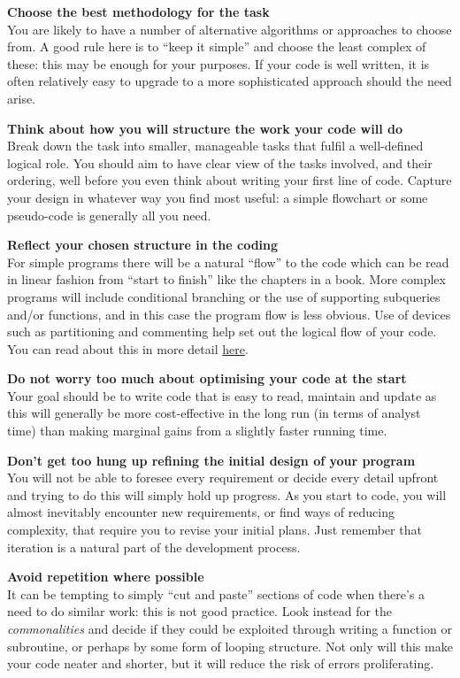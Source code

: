 \documentclass[
]{book}
\begin{document}
\textbf{Choose the best methodology for the task}\\
You are likely to have a number of alternative algorithms or approaches to choose from. A good rule here is to ``keep it simple'' and choose the least complex of these: this may be enough for your purposes. If your code is well written, it is often relatively easy to upgrade to a more sophisticated approach should the need arise.

\textbf{Think about how you will structure the work your code will do}\\
Break down the task into smaller, manageable tasks that fulfil a well-defined logical role. You should aim to have clear view of the tasks involved, and their ordering, well before you even think about writing your first line of code. Capture your design in whatever way you find most useful: a simple flowchart or some pseudo-code is generally all you need.

\textbf{Reflect your chosen structure in the coding}\\
For simple programs there will be a natural ``flow'' to the code which can be read in linear fashion from ``start to finish'' like the chapters in a book. More complex programs will include conditional branching or the use of supporting subqueries and/or functions, and in this case the program flow is less obvious. Use of devices such as partitioning and commenting help set out the logical flow of your code. You can read about this in more detail \protect\hyperlink{code_structure}{here}.

\textbf{Do not worry too much about optimising your code at the start}\\
Your goal should be to write code that is easy to read, maintain and update as this will generally be more cost-effective in the long run (in terms of analyst time) than making marginal gains from a slightly faster running time.

\textbf{Don't get too hung up refining the initial design of your program}\\
You will not be able to foresee every requirement or decide every detail upfront and trying to do this will simply hold up progress. As you start to code, you will almost inevitably encounter new requirements, or find ways of reducing complexity, that require you to revise your initial plans. Just remember that iteration is a natural part of the development process.

\textbf{Avoid repetition where possible}\\
It can be tempting to simply ``cut and paste'' sections of code when there's a need to do similar work: this is not good practice. Look instead for the \emph{commonalities} and decide if they could be exploited through writing a function or subroutine, or perhaps by some form of looping structure. Not only will this make your code neater and shorter, but it will reduce the risk of errors proliferating.
\end{document}

